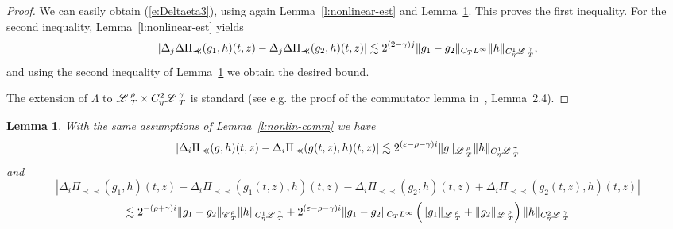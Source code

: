 \documentclass[11pt,reqno]{amsart}
\newcommand{\precprec}{\prec\!\!\!\prec}
\newtheorem{lemma}[theorem]{Lemma}
\newcommand{\CC}{\mathscr{C} \hspace{.1em}}
\newcommand{\LL}{\mathscr{L} \hspace{.2em}}
\begin{document}
\begin{proof}
  We can easily obtain (\ref{e:Deltaeta3}), using again
  Lemma~\ref{l:nonlinear-est} and Lemma~\ref{l:para-increment}. This proves
  the first inequality. For the second inequality, Lemma~\ref{l:nonlinear-est}
  yields
  \[ | \Delta_j \Delta \Pi_{\precprec} (g_1, h) (t, z) - \Delta_j \Delta
     \Pi_{\precprec} (g_2, h) (t, z) | \lesssim 2^{(2 - \gamma) j} \| g_1 -
     g_2 \|_{C_T L^{\infty}} \| h \|_{C^1_{\eta} \LL^{\gamma}_T}, \]
  and using the second inequality of Lemma~\ref{l:para-increment} we obtain
  the desired bound.
  
  The extension of $\Lambda$ to $\LL^{\rho}_T \times C_{\eta}^2
  \LL_T^{\gamma}$ is standard (see e.g. the proof of the commutator lemma
  in~{\cite{gubinelli_paracontrolled_2015}}, Lemma~2.4). 
\end{proof}

\begin{lemma}
  \label{l:para-increment}With the same assumptions of
  Lemma~\ref{l:nonlin-comm} we have
  \[ | \Delta_i \Pi_{\precprec} (g, h) (t, z) - \Delta_i \Pi_{\precprec} (g
     (t, z), h) (t, z) | \lesssim 2^{(\varepsilon - \rho - \gamma) i} \| g
     \|_{\LL^{\rho}_T} \| h \|_{C_{\eta}^1 \LL^{\gamma}_{_T}} \]
  and
  \[ \left| \Delta_i \Pi_{\precprec} (g_1, h) (t, z) - \Delta_i
     \Pi_{\precprec} (g_1 (t, z), h) (t, z) - \Delta_i \Pi_{\precprec} (g_2,
     h) (t, z) + \Delta_i \Pi_{\precprec} (g_2 (t, z), h) (t, z) \right| \]
  \[ \lesssim 2^{- (\rho + \gamma) i} \| g_1 - g_2 \|_{\CC^{\rho}_T} \| h
     \|_{C_{\eta}^1 \LL^{\gamma}_T} + 2^{(\varepsilon - \rho - \gamma) i} \|
     g_1 - g_2 \|_{C_T L^{\infty}} \left( \| g_1 \|_{\LL^{\rho}_T} + \| g_2
     \|_{\LL^{\rho}_T} \right) \| h \|_{C_{\eta}^2 \LL^{\gamma}_T} \]
\end{lemma}
\end{document}
